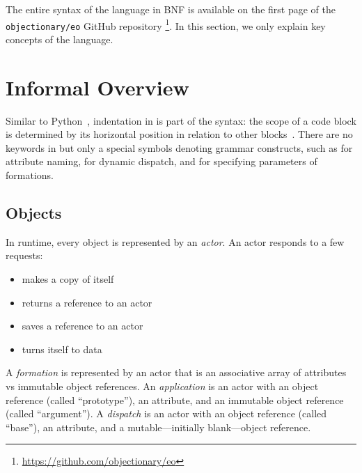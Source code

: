 
The entire syntax of the \eolang{} language in BNF is available on the first page of the \texttt{objectionary/eo} GitHub repository%
  \footnote{\url{https://github.com/objectionary/eo}}.
In this section, we only explain key concepts of the language.

\section{Informal Overview}

Similar to Python~\citep{lutz2013learning}, indentation in \eolang{} is part of the syntax: the scope of a code block is determined by its horizontal position in relation to other blocks~\citep{landin1966next}.
There are no keywords in \eolang{} but only a special symbols denoting grammar constructs, such as \ff{>} for attribute naming,  for dynamic dispatch, and \ff{[]} for specifying parameters of formations.



\subsection{Objects}

In \eolang{} runtime, every object is represented by an \emph{actor}.
An actor responds to a few requests:
\begin{itemize}
  \item {} makes a copy of itself
  \item {} returns a reference to an actor
  \item {} saves a reference to an actor
  \item {} turns itself to data
\end{itemize}

A \emph{formation} is represented by an actor that is an associative array of attributes vs immutable object references.
An \emph{application} is an actor with an object reference (called ``prototype''), an attribute, and an immutable object reference (called ``argument'').
A \emph{dispatch} is an actor with an object reference (called ``base''), an attribute, and a mutable---initially blank---object reference.

